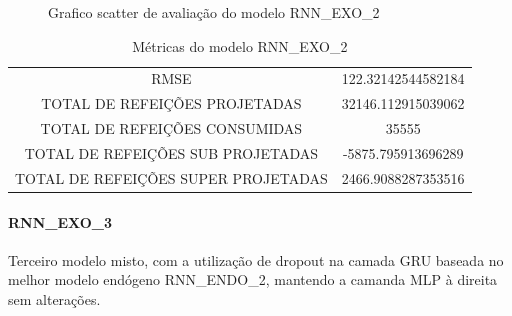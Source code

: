 \documentclass[	12pt, Times, openright, twoside, a4paper, english, brazil]{abntex2}
\begin{document}
{\begin{center}
\begin{minipage}[c]{0.45\textwidth}
\begin{figure}[H]
                  \caption{Grafico scatter de avaliação do modelo RNN\_EXO\_2 \label{fig:case1_rnn_exo_2_val_scatter} }
                \end{figure}
                  \end{minipage} \end{center} }
                
                
               
                
                 \begin{table}[!ht]
                \centering
                \caption{Métricas do modelo  RNN\_EXO\_2 }
                 \begin{tabular}{|c|c|}
                 \rowcolor{gray!50}
                 \hline
                \multicolumn{2}{c}{METRICAS DO MODELO RNN\_EXO\_2 :}\\ \hline
                RMSE & 122.32142544582184\\
                TOTAL DE REFEIÇÕES PROJETADAS & 32146.112915039062\\
                TOTAL DE REFEIÇÕES CONSUMIDAS & 35555\\
                TOTAL DE REFEIÇÕES SUB PROJETADAS & -5875.795913696289\\
                TOTAL DE REFEIÇÕES SUPER PROJETADAS & 2466.9088287353516\\
                \hline \end{tabular}
                \end{table}
                
                
              \paragraph{RNN\_EXO\_3}
                Terceiro modelo misto, com a utilização de dropout na camada GRU baseada no melhor modelo endógeno RNN\_ENDO\_2, mantendo a camanda MLP à direita sem alterações.
              
\end{document}
